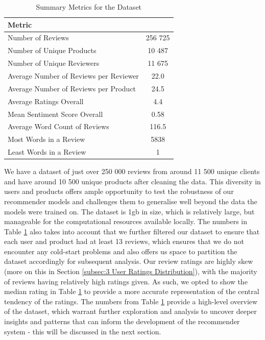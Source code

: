 \begin{table}[h]
  \centering
  \begin{tabular}{|p{10cm}|c|}
  \hline
  \textbf{Metric}                                & \textbf{}            \\
  \hline
  Number of Reviews                     & 256 725          \\
  \hline
  Number of Unique Products             & 10 487          \\
  \hline
  Number of Unique Reviewers            & 11 675          \\
  \hline
  Average Number of Reviews per Reviewer& 22.0        \\
  \hline
  Average Number of Reviews per Product & 24.5        \\
  \hline
  Average Ratings Overall               & 4.4        \\
  \hline
  Mean Sentiment Score Overall          & 0.58           \\
  \hline
  Average Word Count of Reviews         & 116.5        \\
  \hline
  Most Words in a Review                &   5838      \\
  \hline
  Least Words in a Review               &   1      \\
  \hline
  \end{tabular}
  \caption{Summary Metrics for the Dataset}
  \label{tab:data statistics overview}
  \end{table}

 We have a dataset of just over 250 000 reviews from around 11 500 unique clients and have around 10 500 unique products after cleaning the data. This diversity in users and products offers ample opportunity to test the robustness of our recommender models and challenges them to generalise well beyond the data the models were trained on. The dataset is 1gb in size, which is relatively large, but manageable for the computational resources available locally. The numbers in Table \ref{tab:data statistics overview} also takes into account that we further filtered our dataset to ensure that each user and product had at least 13 reviews, which ensures that we do not encounter any cold-start problems and also offers us space to partition the dataset accordingly for subsequent analysis. Our review ratings are highly skew (more on this in Section \ref{subsec:3 User Ratings Distribution}), with the majority of reviews having relatively high ratings given. As such, we opted to show the median rating in Table \ref{tab:data statistics overview} to provide a more accurate representation of the central tendency of the ratings. The numbers from Table \ref{tab:data statistics overview} provide a high-level overview of the dataset, which warrant further exploration and analysis to uncover deeper insights and patterns that can inform the development of the recommender system - this will be discussed in the next section.

